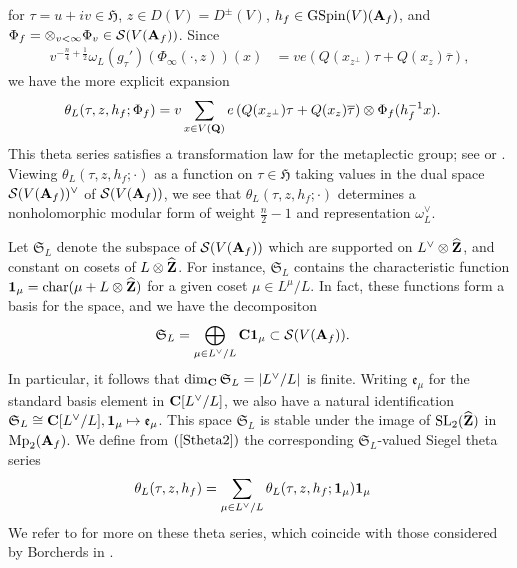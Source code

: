 \documentclass{amsart}
\theoremstyle{definition}
\theoremstyle{definition}
\theoremstyle{definition}
\begin{document}
for $\tau = u + iv \in \mathfrak{H}$, $z \in D(V) = D^{\pm}(V)$, $h_f \in \operatorname{GSpin}(V)({\bf{A}}_f)$, 
and $\Phi_f = \otimes_{v<\infty} \Phi_v \in \mathcal{S}(V({\bf{A}}_f))$. Since 
\begin{align*} v^{-\frac{n}{4} + \frac{1}{2}} \omega_L(g_{\tau}') \left( \Phi_{\infty}(\cdot, z) \right)(x) 
&= v e\left( Q(x_{z^{\perp}}) \tau + Q(x_z) \overline{\tau}  \right), \end{align*} we have the more explicit expansion  
\begin{align}\label{Stheta2} \theta_L(\tau, z, h_f; \Phi_f) &= v \sum\limits_{x \in V({\bf{Q}})}
e\left( Q(x_{z^{\perp}}) \tau + Q(x_z) \overline{\tau}  \right) \otimes \Phi_f (h_f^{-1} x).\end{align}
This theta series satisfies a transformation law for the metaplectic group; see \cite{KuBF} or \cite[(2.5)]{BY}.
Viewing $\theta_L(\tau, z, h_f; \cdot)$ as a function on $\tau \in \mathfrak{H}$ taking values in the dual space $\mathcal{S}(V({\bf{A}}_f))^{\vee}$
of $\mathcal{S}(V({\bf{A}}_f))$, we see that $\theta_L(\tau, z, h_f; \cdot)$ determines a nonholomorphic modular form of weight $\frac{n}{2} - 1$ 
and representation $\omega_L^{\vee}$. 
  
Let $\mathfrak{S}_L$ denote the subspace of $\mathcal{S}(V({\bf{A}}_f))$ which are supported on $L^{\vee} \otimes \widehat{\bf{Z}}$,
and constant on cosets of $L \otimes \widehat{ {\bf{Z}} }$. For instance, $\mathfrak{S}_L$ contains the characteristic function
${\bf{1}}_{\mu} = \operatorname{char}(\mu + L \otimes \widehat{ {\bf{Z}} })$ for a given coset $\mu \in L^{\mu}/L$. In fact, these
functions form a basis for the space, and we have the decompositon
\begin{align*} \mathfrak{S}_L &= \bigoplus_{\mu \in L^{\vee}/L} {\bf{C}} {{\bf{1}}}_{\mu} \subset \mathcal{S}(V({\bf{A}}_f)). \end{align*}
In particular, it follows that $\dim_{\bf{C}} \mathfrak{S}_L = \vert L^{\vee}/L \vert$ is finite. Writing $\mathfrak{e}_{\mu}$ for the standard
basis element in ${\bf{C}}[L^{\vee}/L]$, we also have a natural identification $\mathfrak{S}_L \cong {\bf{C}}[L^{\vee}/L], {\bf{1}}_{\mu} \mapsto \mathfrak{e}_{\mu}$.
This space $\mathfrak{S}_L$ is stable under the image of $\operatorname{SL}_2(\widehat{\bf{Z}})$ in $\operatorname{Mp}_2({\bf{A}}_f)$.
We define from $(\ref{Stheta2})$ the corresponding $\mathfrak{S}_L$-valued Siegel theta series 
\begin{equation}\begin{aligned}\label{Stheta3}
\theta_L(\tau, z, h_f) &= \sum\limits_{\mu \in L^{\vee}/L} \theta_L(\tau, z, h_f; {\bf{1}}_{\mu}) {\bf{1}}_{\mu} \end{aligned}\end{equation}
We refer to \cite[$\S$2]{BY} for more on these theta series, which coincide with those considered by Borcherds in \cite{Bo}.
   
\end{document}
